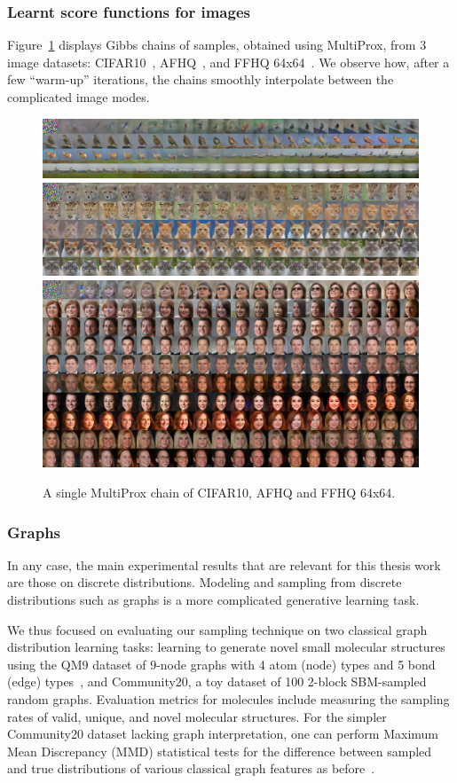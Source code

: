 \subsubsection{Learnt score functions for images}
Figure~\ref{fig:multiprox_images} displays Gibbs chains of samples, obtained using MultiProx, from 3 image datasets: CIFAR10~\cite{krizhevsky_learning_2009}, AFHQ~\cite{choi_stargan_2020}, and FFHQ 64x64~\cite{karras_style-based_2019}. We observe how, after a few \enquote{warm-up} iterations, the chains smoothly interpolate between the complicated image modes.
\begin{figure}[H]
    \centering
    \includegraphics[width=0.49\linewidth]{figures/multiprox/cifar10.png}
    \includegraphics[width=0.49\linewidth]{figures/multiprox/afhq.png}
\includegraphics[width=0.75\linewidth]{figures/multiprox/ffhq.png}
    \caption{A single MultiProx chain of CIFAR10, AFHQ and FFHQ 64x64.}
    \label{fig:multiprox_images}
\end{figure} 

\subsubsection{Graphs}
In any case, the main experimental results that are relevant for this thesis work are those on discrete distributions. Modeling and sampling from discrete distributions such as graphs is a more complicated generative learning task. 

We thus focused on evaluating our sampling technique on two classical graph distribution learning tasks: learning to generate novel small molecular structures using the QM9 dataset of 9-node graphs with 4 atom (node) types and 5 bond (edge) types~\cite{ruddigkeit_enumeration_2012, ramakrishnan_quantum_2014}, and Community20, a toy dataset of 100 2-block SBM-sampled random graphs. Evaluation metrics for molecules include measuring the sampling rates of valid, unique, and novel molecular structures. For the simpler Community20 dataset lacking graph interpretation, one can perform Maximum Mean Discrepancy (MMD) statistical tests for the difference between sampled and true distributions of various classical graph features as before~\cite{gretton_kernel_2012, liao_efficient_2019}.

